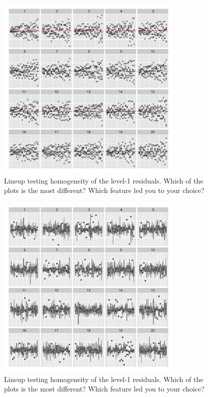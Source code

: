 \documentclass[12pt]{article} %
\begin{document}
\begin{figure}[hbt]
	\centering
	\includegraphics[width=0.8\textwidth]{dialyzerhomogeneous-dots-1-19.pdf}
	\caption{\label{homogeneous-1}
	Lineup testing homogeneity of the level-1 residuals. Which of the plots is the most different? Which feature led you to your choice?}
\end{figure}
\begin{figure}[hbt]
	\centering
	\includegraphics[width=0.8\textwidth]{dialyzerhomogeneous-1-19.pdf}
	\caption{ \label{homogeneous-2}
	Lineup testing homogeneity of the level-1 residuals. Which of the plots is the most different? Which feature led you to your choice?}
\end{figure}
\end{document}
